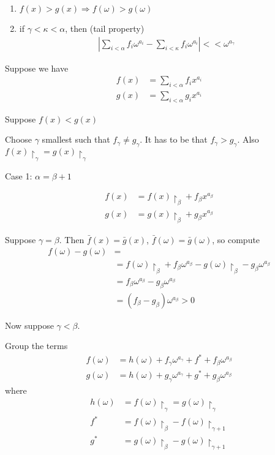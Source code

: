 \documentclass{article}
\newcommand{\paren}[1]{\left( #1 \right)}
\newcommand{\w}{\omega}
\newcommand{\midr}[1]{\restriction_{#1}}
\begin{document}
\begin{enumerate}
	\item $f(x) > g(x) \Rightarrow f(\w) > g(\w)$
	\item if $\gamma < \kappa < \alpha$, then (tail property)
	\begin{align*}
		\left| \sum_{i < \alpha} f_i \w^{a_i} - \sum_{i < \kappa} f_i \w^{a_i} \right| << \w^{a_\gamma}
	\end{align*}
\end{enumerate}

Suppose we have
\begin{align*}
  f(x) &= \sum_{i < \alpha} f_i x^{a_i} \\
  g(x) &= \sum_{i < \alpha} g_i x^{a_i}
\end{align*}

Suppose $f(x) < g(x)$

Choose $\gamma$ smallest such that $f_\gamma \neq g_\gamma$.
It has to be that $f_\gamma > g_\gamma$. Also $f(x)\midr\gamma = g(x)\midr\gamma$

Case 1: $\alpha = \beta + 1$

\begin{align*}
  f(x) &= f(x)\midr\beta + f_\beta x^{a_\beta}\\
  g(x) &= g(x)\midr\beta + g_\beta x^{a_\beta}
\end{align*}

Suppose $\gamma = \beta$.
Then $\bar f(x) = \bar g(x)$, $\bar f(\w) = \bar g(\w)$, so compute
\begin{align*}
  f(\w) - g(\w) &= \\
	&= f(\w)\midr\beta + f_\beta \w^{a_\beta} - g(\w)\midr\beta - g_\beta \w^{a_\beta} \\
	&= f_\beta \w^{a_\beta} - g_\beta \w^{a_\beta} \\
	&= \paren{f_\beta - g_\beta} \w^{a_\beta} > 0
\end{align*}

Now suppose $\gamma < \beta$.

Group the terms
\begin{align*}
  f(\w) &= h(\w) + f_\gamma \w^{a_\gamma} + f^* + f_\beta \w^{a_\beta} \\
  g(\w) &= h(\w) + g_\gamma \w^{a_\gamma} + g^* + g_\beta \w^{a_\beta}
\end{align*}
where
\begin{align*}
	h(\w) &= f(\w)\midr\gamma = g(\w)\midr\gamma \\
	f^* &= f(\w)\midr\beta - f(\w)\midr{\gamma + 1} \\
	g^* &= g(\w)\midr\beta - g(\w)\midr{\gamma + 1}
\end{align*}
\end{document}

